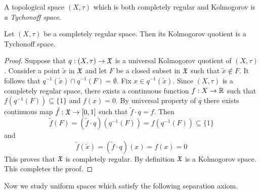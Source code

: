 \begin{definition}
A topological space $(X,\tau)$ which is both completely regular and Kolmogorov is \textit{a Tychonoff space}. 
\end{definition}

\begin{proposition}\label{proposition:Kolmogorov_quotient_of_completely_regular_space_is_Tychonoff}
Let $(X,\tau)$ be a completely regular space. Then its Kolmogorov quotient is a Tychonoff space.
\end{proposition}
\begin{proof}
Suppose that $q:\left(X,\tau\right) \rightarrow {\mathfrak X}$ is a universal Kolmogorov quotient of $\left(X,\tau\right)$. Consider a point $\tilde{x}$ in ${\mathfrak X}$ and let $F$ be a closed subset in ${\mathfrak X}$ such that $\tilde{x} \not \in F$. It follows that $q^{-1}(\tilde{x}) \cap q^{-1}(F) = \emptyset$. Fix $x \in q^{-1}(\tilde{x})$. Since $\left(X,\tau\right)$ is a completely regular space, there exists a continuous function $f:X\rightarrow {\mathbb R}$ such that $f\left(q^{-1}(F)\right) \subseteq \{1\}$ and $f\left(x\right) = 0$. By universal property of $q$ there exists continuous map $\tilde{f}:{\mathfrak X}\rightarrow [0,1]$ such that $\tilde{f} \cdot q = f$. Then 
$$\tilde{f}(F) = \left(\tilde{f}\cdot q\right)\left(q^{-1}(F)\right) = f\left(q^{-1}\left(F\right)\right) \subseteq \{1\}$$
and 
$$\tilde{f}\left(\tilde{x}\right) = \left(\tilde{f}\cdot q\right)(x) = f(x) = 0$$
This proves that ${\mathfrak X}$ is completely regular. By definition ${\mathfrak X}$ is a Kolmogorov space. This completes the proof.
\end{proof}
\noindent
Now we study uniform spaces which satisfy the following separation axiom. 



